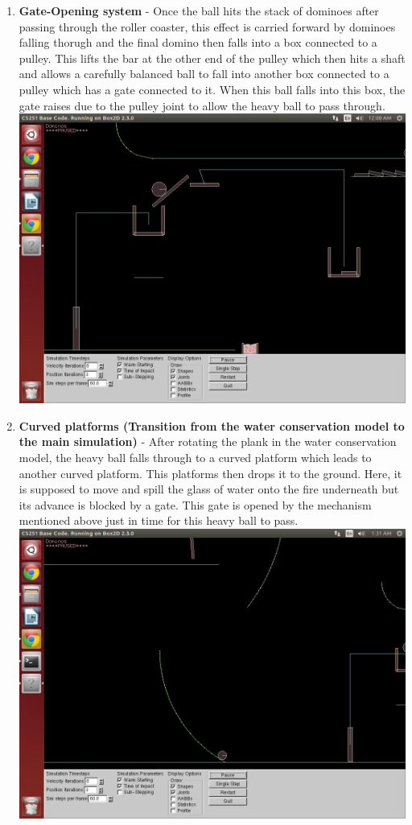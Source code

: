 \documentclass{report}
\begin{document}
\begin{enumerate}
\item \textbf{Gate-Opening system} - Once the ball hits the stack of dominoes after passing through the roller coaster, this effect is carried forward by dominoes falling thorugh and the final domino then falls into a box connected to a pulley. This lifts the bar at the other end of the pulley which then hits a shaft and allows a carefully balanced ball to fall into another box connected to a pulley which has a gate connected to it. When this ball falls into this box, the gate raises due to the pulley joint to allow the heavy ball to pass through.\\
\includegraphics[scale=0.20]{pics/LowerGateMechanism}
\item \textbf{Curved platforms (Transition from the water conservation model to the main simulation)} - After rotating the plank in the water conservation model, the heavy ball falls through to a curved platform which leads to another curved platform. This platforms then drops it to the ground. Here, it is supposed to move and spill the glass of water onto the fire underneath but its advance is blocked by a gate. This gate is opened by the mechanism mentioned above just in time for this heavy ball to pass.\\
\includegraphics[scale=0.20]{pics/HeavyBall}
\pagebreak


\end{enumerate}
\end{document}
